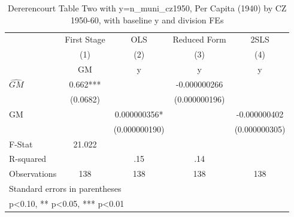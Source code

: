 \begin{table}[htbp]\centering
\def\sym#1{\ifmmode^{#1}\else\(^{#1}\)\fi}
\caption{Dererencourt Table Two with y=n\_muni\_cz1950, Per Capita (1940) by CZ 1950-60, with baseline y and division FEs}
\begin{tabular}{l*{4}{c}}
\toprule
                    & First Stage   &         OLS   &Reduced Form   &        2SLS   \\
                    &\multicolumn{1}{c}{(1)}&\multicolumn{1}{c}{(2)}&\multicolumn{1}{c}{(3)}&\multicolumn{1}{c}{(4)}\\
                    &\multicolumn{1}{c}{GM}&\multicolumn{1}{c}{y}&\multicolumn{1}{c}{y}&\multicolumn{1}{c}{y}\\
\midrule
$\hat{GM}$          &       0.662***&               &-0.000000266   &               \\
                    &    (0.0682)   &               &(0.000000196)   &               \\
\addlinespace
GM                  &               & 0.000000356*  &               &-0.000000402   \\
                    &               &(0.000000190)   &               &(0.000000305)   \\
\midrule
F-Stat              &      21.022   &               &               &               \\
R-squared           &               &         .15   &         .14   &               \\
Observations        &         138   &         138   &         138   &         138   \\
\bottomrule
\multicolumn{5}{l}{\footnotesize Standard errors in parentheses}\\
\multicolumn{5}{l}{\footnotesize * p<0.10, ** p<0.05, *** p<0.01}\\
\end{tabular}
\end{table}
